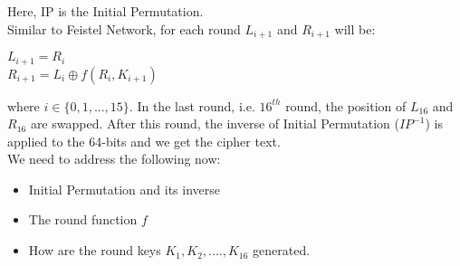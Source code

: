 \documentclass[11pt]{article}
\begin{document}
Here, IP is the Initial Permutation.\\
\vspace{3mm}
Similar to Feistel Network, for each round $L_{i+1}$ and $R_{i+1}$ will be:
\begin{center}
    $L_{i+1} = R_i$\\
    $R_{i+1} = L_i \oplus f(R_i, K_{i+1})$
\end{center}
where $i \in \{0, 1,..., 15\}$. In the last round, i.e. $16^{th}$ round, the position of $L_{16}$ and $R_{16}$ are swapped. After this round, the inverse of Initial Permutation ($IP^{-1}$) is applied to the 64-bits and we get the cipher text.\\
\newline
We need to address the following now:
\begin{itemize}
    \item Initial Permutation and its inverse
    \item The round function $f$
    \item How are the round keys $K_1, K_2, ...., K_{16}$ generated.
\end{itemize}
\end{document}
